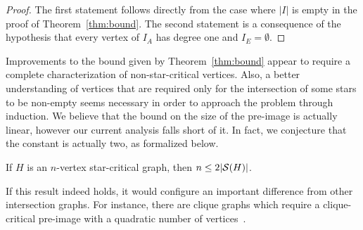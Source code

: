 \begin{proof}
    The first statement follows directly from the case where $|I|$ is empty in the proof of Theorem~\ref{thm:bound}.
    The second statement is a consequence of the hypothesis that every vertex of $I_A$ has degree one and $I_E = \emptyset$.
\end{proof}

Improvements to the bound given by Theorem~\ref{thm:bound} appear to require a complete characterization of non-star-critical vertices.
Also, a better understanding of vertices that are required only for the intersection of some stars to be non-empty seems necessary in order to approach the problem through induction.
We believe that the bound on the size of the pre-image is actually linear, however our current analysis falls short of it.
In fact, we conjecture that the constant is actually two, as formalized below.

\begin{conjecture}
    If $H$ is an $n$-vertex star-critical graph, then $n \leq 2|\mathcal{S}(H)|$.
\end{conjecture}

If this result indeed holds, it would configure an important difference from other intersection graphs.
For instance, there are clique graphs which require a clique-critical pre-image with a quadratic number of vertices~\cite{clique_critical_alcon}.